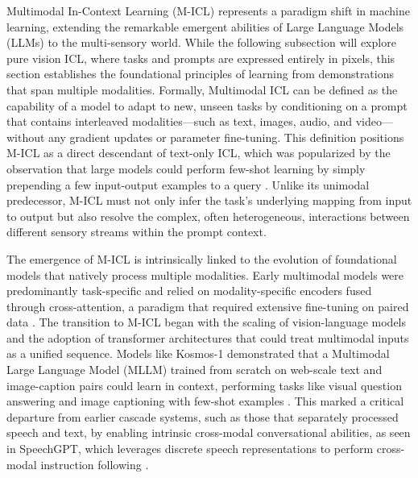 \documentclass[11pt]{article}
\begin{document}
Multimodal In-Context Learning (M-ICL) represents a paradigm shift in machine learning, extending the remarkable emergent abilities of Large Language Models (LLMs) to the multi-sensory world. While the following subsection will explore pure vision ICL, where tasks and prompts are expressed entirely in pixels, this section establishes the foundational principles of learning from demonstrations that span multiple modalities. Formally, Multimodal ICL can be defined as the capability of a model to adapt to new, unseen tasks by conditioning on a prompt that contains interleaved modalities---such as text, images, audio, and video---without any gradient updates or parameter fine-tuning. This definition positions M-ICL as a direct descendant of text-only ICL, which was popularized by the observation that large models could perform few-shot learning by simply prepending a few input-output examples to a query \cite{ref212}. Unlike its unimodal predecessor, M-ICL must not only infer the task's underlying mapping from input to output but also resolve the complex, often heterogeneous, interactions between different sensory streams within the prompt context.

The emergence of M-ICL is intrinsically linked to the evolution of foundational models that natively process multiple modalities. Early multimodal models were predominantly task-specific and relied on modality-specific encoders fused through cross-attention, a paradigm that required extensive fine-tuning on paired data \cite{ref213,ref214}. The transition to M-ICL began with the scaling of vision-language models and the adoption of transformer architectures that could treat multimodal inputs as a unified sequence. Models like Kosmos-1 demonstrated that a Multimodal Large Language Model (MLLM) trained from scratch on web-scale text and image-caption pairs could learn in context, performing tasks like visual question answering and image captioning with few-shot examples \cite{ref11}. This marked a critical departure from earlier cascade systems, such as those that separately processed speech and text, by enabling intrinsic cross-modal conversational abilities, as seen in SpeechGPT, which leverages discrete speech representations to perform cross-modal instruction following \cite{ref215}.
\end{document}
